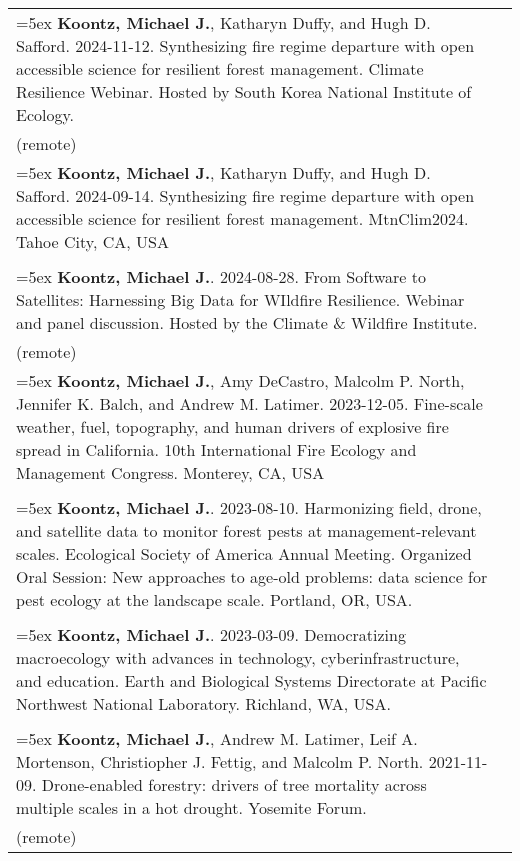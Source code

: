 \begin{longtable}{@{}>{\raggedright}p{5.25in} @{} >{\raggedleft}X@{}}

\hangindent=5ex \textbf{Koontz, Michael J.}, Katharyn Duffy, and Hugh D. Safford. 2024-11-12. Synthesizing fire regime departure with open accessible science for resilient forest management. Climate Resilience Webinar. Hosted by South Korea National Institute of Ecology. & 2024 \\ (remote) \tabularnewline

\hangindent=5ex \textbf{Koontz, Michael J.}, Katharyn Duffy, and Hugh D. Safford. 2024-09-14. Synthesizing fire regime departure with open accessible science for resilient forest management. MtnClim2024. Tahoe City, CA, USA & 2024 \\ \tabularnewline

\hangindent=5ex \textbf{Koontz, Michael J.}. 2024-08-28. From Software to Satellites: Harnessing Big Data for WIldfire Resilience. Webinar and panel discussion. Hosted by the Climate \& Wildfire Institute. & 2024 \\ (remote)  \tabularnewline

\hangindent=5ex \textbf{Koontz, Michael J.}, Amy DeCastro, Malcolm P. North, Jennifer K. Balch, and Andrew M. Latimer. 2023-12-05. Fine-scale weather, fuel, topography, and human drivers of explosive fire spread in California. 10th International Fire Ecology and Management Congress. Monterey, CA, USA & 2023 \\ \tabularnewline

\hangindent=5ex \textbf{Koontz, Michael J.}. 2023-08-10. Harmonizing field, drone, and satellite data to monitor forest pests at management-relevant scales. Ecological Society of America Annual Meeting. Organized Oral Session: New approaches to age-old problems: data science for pest ecology at the landscape scale. Portland, OR, USA. & 2023 \\  \tabularnewline

\hangindent=5ex \textbf{Koontz, Michael J.}. 2023-03-09. Democratizing macroecology with advances in technology, cyberinfrastructure, and education. Earth and Biological Systems Directorate at Pacific Northwest National Laboratory. Richland, WA, USA. & 2023 \\  \tabularnewline

\hangindent=5ex \textbf{Koontz, Michael J.}, Andrew M. Latimer, Leif A. Mortenson, Christiopher J. Fettig, and Malcolm P. North. 2021-11-09. Drone-enabled forestry: drivers of tree mortality across multiple scales in a hot drought. Yosemite Forum. & 2021 \\ (remote) \tabularnewline


\end{longtable}
